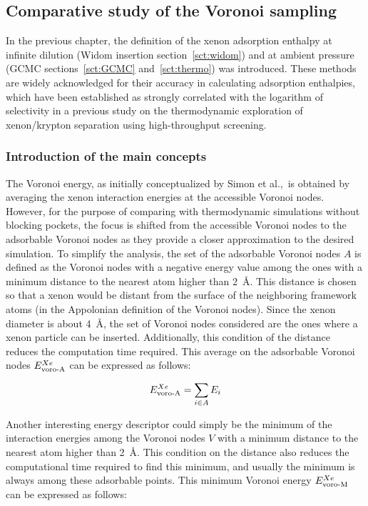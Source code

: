\documentclass[main]{subfiles}
\begin{document}
\subsection{Comparative study of the Voronoi sampling}

In the previous chapter, the definition of the xenon adsorption enthalpy at infinite dilution (Widom insertion section~\ref{sct:widom}) and at ambient pressure (GCMC sections~\ref{sct:GCMC} and~\ref{sct:thermo}) was introduced. These methods are widely acknowledged for their accuracy in calculating adsorption enthalpies, which have been established as strongly correlated with the logarithm of selectivity in a previous study on the thermodynamic exploration of xenon/krypton separation using high-throughput screening.

\subsubsection{Introduction of the main concepts}

The Voronoi energy, as initially conceptualized by Simon et al.,\ is obtained by averaging the xenon interaction energies at the accessible Voronoi nodes. However, for the purpose of comparing with thermodynamic simulations without blocking pockets, the focus is shifted from the accessible Voronoi nodes to the adsorbable Voronoi nodes as they provide a closer approximation to the desired simulation. To simplify the analysis, the set of the adsorbable Voronoi nodes $A$ is defined as the Voronoi nodes with a negative energy value among the ones with a minimum distance to the nearest atom higher than \SI{2}{\angstrom}. This distance is chosen so that a xenon would be distant from the surface of the neighboring framework atoms (in the Appolonian definition of the Voronoi nodes). Since the xenon diameter is about \SI{4}{\angstrom}, the set of Voronoi nodes considered are the ones where a xenon particle can be inserted. Additionally, this condition of the distance reduces the computation time required. This average on the adsorbable Voronoi nodes $E_{\text{voro-A}}^{Xe}$ can be expressed as follows:

\begin{equation}
    E_{\text{voro-A}}^{Xe} = \sum_{i \in A} E_i
\end{equation}

Another interesting energy descriptor could simply be the minimum of the interaction energies among the Voronoi nodes $V$ with a minimum distance to the nearest atom higher than \SI{2}{\angstrom}. This condition on the distance also reduces the computational time required to find this minimum, and usually the minimum is always among these adsorbable points. This minimum Voronoi energy $E_{\text{voro-M}}^{Xe}$ can be expressed as follows: 
\end{document}

